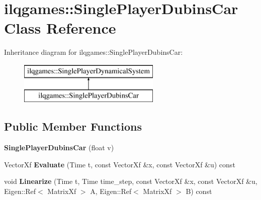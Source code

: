 \hypertarget{classilqgames_1_1_single_player_dubins_car}{}\section{ilqgames\+:\+:Single\+Player\+Dubins\+Car Class Reference}
\label{classilqgames_1_1_single_player_dubins_car}
Inheritance diagram for ilqgames\+:\+:Single\+Player\+Dubins\+Car\+:\begin{figure}[H]
\begin{center}
\leavevmode
\includegraphics[height=2.000000cm]{classilqgames_1_1_single_player_dubins_car}
\end{center}
\end{figure}
\subsection*{Public Member Functions}
\begin{DoxyCompactItemize}
\item 
{\bfseries Single\+Player\+Dubins\+Car} (float v)\hypertarget{classilqgames_1_1_single_player_dubins_car_aa035123822485f51501c6f0f21a59c34}{}\label{classilqgames_1_1_single_player_dubins_car_aa035123822485f51501c6f0f21a59c34}

\item 
Vector\+Xf {\bfseries Evaluate} (Time t, const Vector\+Xf \&x, const Vector\+Xf \&u) const \hypertarget{classilqgames_1_1_single_player_dubins_car_a8f44090ac61f4543043fd9351b9192bb}{}\label{classilqgames_1_1_single_player_dubins_car_a8f44090ac61f4543043fd9351b9192bb}

\item 
void {\bfseries Linearize} (Time t, Time time\+\_\+step, const Vector\+Xf \&x, const Vector\+Xf \&u, Eigen\+::\+Ref$<$ Matrix\+Xf $>$ A, Eigen\+::\+Ref$<$ Matrix\+Xf $>$ B) const \hypertarget{classilqgames_1_1_single_player_dubins_car_a24b3cd9d9d9764099b48f216a8133214}{}\label{classilqgames_1_1_single_player_dubins_car_a24b3cd9d9d9764099b48f216a8133214}

\end{DoxyCompactItemize}
